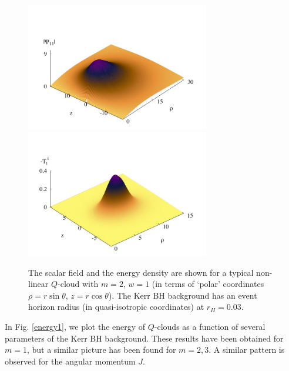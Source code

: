 \begin{figure}[h!]
\centering
\includegraphics[height=2.2in]{papers/QClouds/Z-3d.jpeg}
\includegraphics[height=2.2in]{papers/QClouds/E-3d.jpeg}
\caption{The scalar field and the energy density are shown for a typical
 non-linear $Q$-cloud with $m=2$, $w =1$ (in terms of `polar' coordinates $\rho=r\sin \theta$,
 $z=r \cos \theta$).
The Kerr BH background has an event horizon radius (in quasi-isotropic coordinates) at
 $r_H=0.03$. 
} 
\label{densities}
\end{figure}




In Fig. \ref{energy1}, we plot the energy 
of $Q$-clouds as a function of several parameters of the Kerr BH background. These results have been obtained for $m=1$, but a similar picture has been found for $m=2,3$. A similar pattern is observed for the angular momentum $J$.



